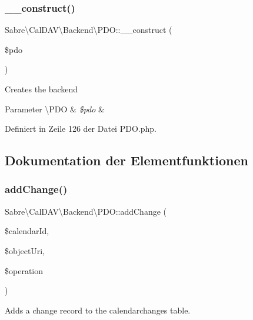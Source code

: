 \subsubsection{\texorpdfstring{\+\_\+\+\_\+construct()}{\_\_construct()}}
{\footnotesize\ttfamily Sabre\textbackslash{}\+Cal\+D\+A\+V\textbackslash{}\+Backend\textbackslash{}\+P\+D\+O\+::\+\_\+\+\_\+construct (\begin{DoxyParamCaption}\item[{\textbackslash{}\mbox{\hyperlink{class_sabre_1_1_cal_d_a_v_1_1_backend_1_1_p_d_o}{P\+DO}}}]{\$pdo }\end{DoxyParamCaption})}

Creates the backend


\begin{DoxyParams}[1]{Parameter}
\textbackslash{}\+P\+DO & {\em \$pdo} & \\
\hline
\end{DoxyParams}


Definiert in Zeile 126 der Datei P\+D\+O.\+php.



\subsection{Dokumentation der Elementfunktionen}
\mbox{\label{class_sabre_1_1_cal_d_a_v_1_1_backend_1_1_p_d_o_a45f3b269b8cf0d8e049cb321af846ebd}} 
\subsubsection{\texorpdfstring{add\+Change()}{addChange()}}
{\footnotesize\ttfamily Sabre\textbackslash{}\+Cal\+D\+A\+V\textbackslash{}\+Backend\textbackslash{}\+P\+D\+O\+::add\+Change (\begin{DoxyParamCaption}\item[{}]{\$calendar\+Id,  }\item[{}]{\$object\+Uri,  }\item[{}]{\$operation }\end{DoxyParamCaption})\hspace{0.3cm}{\ttfamily [protected]}}

Adds a change record to the calendarchanges table.


